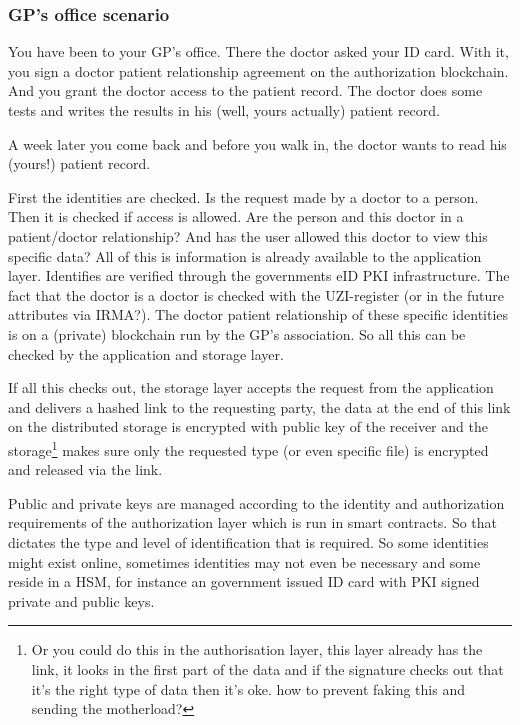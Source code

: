 \documentclass{article}
\begin{document}
\subsubsection{GP's office scenario}
You have been to your GP's office. There the doctor asked your ID card. With it, you sign a doctor patient relationship agreement on the authorization blockchain. And you grant the doctor access to the patient record. The doctor does some tests and writes the results in his (well, yours actually) patient record.

A week later you come back and before you walk in, the doctor wants to read his (yours!) patient record.

First the identities are checked. Is the request made by a doctor to a person. Then it is checked if access is allowed. Are the person and this doctor in a patient/doctor relationship? And has the user allowed this doctor to view this specific data? All of this is information is already available to the application layer. Identifies are verified through the governments eID PKI infrastructure. The fact that the doctor is a doctor is checked with the UZI-register (or in the future attributes via IRMA?). The doctor patient relationship of these specific identities is on a (private) blockchain run by the GP's association. So all this can be checked by the application and storage layer.

If all this checks out, the storage layer accepts the request from the application and delivers a hashed link to the requesting party, the data at the end of this link on the distributed storage is encrypted with public key of the receiver and the storage\footnote{Or you could do this in the authorisation layer, this layer already has the link, it looks in the first part of the data and if the signature checks out that it's the right type of data then it's oke. how to prevent faking this and sending the motherload?} makes sure only the requested type (or even specific file) is encrypted and released via the link.

Public and private keys are managed according to the identity and authorization requirements of the authorization layer which is run in smart contracts. So that dictates the type and level of identification that is required. So some identities might exist online, sometimes identities may not even be necessary and some reside in a HSM, for instance an government issued ID card with PKI signed private and public keys. 

\end{document}
